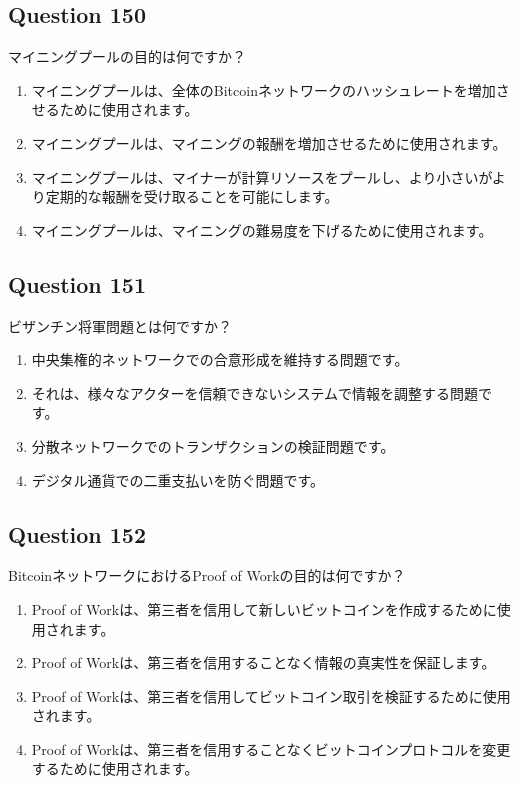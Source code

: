 \documentclass[12pt,a4paper]{article}
\begin{document}
\bigskip


\subsection*{Question 150}
マイニングプールの目的は何ですか？

\begin{enumerate}[label=\Alph*., leftmargin=*]
\item マイニングプールは、全体のBitcoinネットワークのハッシュレートを増加させるために使用されます。
\item マイニングプールは、マイニングの報酬を増加させるために使用されます。
\item マイニングプールは、マイナーが計算リソースをプールし、より小さいがより定期的な報酬を受け取ることを可能にします。
\item マイニングプールは、マイニングの難易度を下げるために使用されます。
\end{enumerate}

\bigskip


\subsection*{Question 151}
ビザンチン将軍問題とは何ですか？

\begin{enumerate}[label=\Alph*., leftmargin=*]
\item 中央集権的ネットワークでの合意形成を維持する問題です。
\item それは、様々なアクターを信頼できないシステムで情報を調整する問題です。
\item 分散ネットワークでのトランザクションの検証問題です。
\item デジタル通貨での二重支払いを防ぐ問題です。
\end{enumerate}

\bigskip


\subsection*{Question 152}
BitcoinネットワークにおけるProof of Workの目的は何ですか？

\begin{enumerate}[label=\Alph*., leftmargin=*]
\item Proof of Workは、第三者を信用して新しいビットコインを作成するために使用されます。
\item Proof of Workは、第三者を信用することなく情報の真実性を保証します。
\item Proof of Workは、第三者を信用してビットコイン取引を検証するために使用されます。
\item Proof of Workは、第三者を信用することなくビットコインプロトコルを変更するために使用されます。
\end{enumerate}
\end{document}
